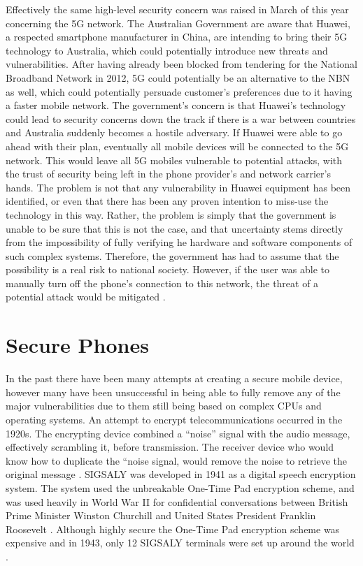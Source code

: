 	Effectively the same high-level security concern was raised in March of this year concerning the 5G network. The Australian Government are aware that Huawei, a respected smartphone manufacturer in China, are intending to bring their 5G technology to Australia, which could potentially introduce new threats and vulnerabilities. After having already been blocked from tendering for the National Broadband Network in 2012, 5G could potentially be an alternative to the NBN as well, which could potentially persuade customer’s preferences due to it having a faster mobile network. 
	The government’s concern is that Huawei’s technology could lead to security concerns down the track if there is a war between countries and Australia suddenly becomes a hostile adversary. If Huawei were able to go ahead with their plan, eventually all mobile devices will be connected to the 5G network. This would leave all 5G mobiles vulnerable to potential attacks, with the trust of security being left in the phone provider’s and network carrier’s hands. The problem is not that any vulnerability in Huawei equipment has been identified, or even that there has been any proven intention to miss-use the technology in this way. Rather, the problem is simply that the government is unable to be sure that this is not the case, and that uncertainty stems directly from the impossibility of fully verifying he hardware and software components of such complex systems. Therefore, the government has had to assume that the possibility is a real risk to national society.
However, if the user was able to manually turn off the phone’s connection to this network, the threat of a potential attack would be mitigated \cite{RN14}.


\section{Secure Phones}

	In the past there have been many attempts at creating a secure mobile device, however many have been unsuccessful in being able to fully remove any of the major vulnerabilities due to them still being based on complex CPUs and operating systems. 
	An attempt to encrypt telecommunications occurred in the 1920s. The encrypting device combined a “noise” signal with the audio message, effectively scrambling it, before transmission. The receiver device who would know how to duplicate the “noise signal, would remove the noise to retrieve the original message \cite{RN30}.
	SIGSALY was developed in 1941 as a digital speech encryption system. The system used the unbreakable One-Time Pad encryption scheme, and was used heavily in World War II for confidential conversations between British Prime Minister Winston Churchill and United States President Franklin Roosevelt \cite{RN21}. Although highly secure the One-Time Pad encryption scheme was expensive and in 1943, only 12 SIGSALY terminals were set up around the world \cite{RN21}.

